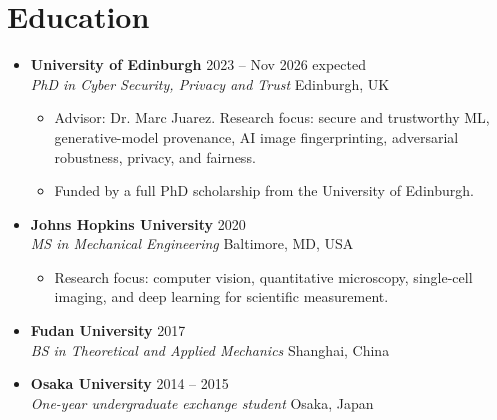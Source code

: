 \documentclass[10pt,a4paper]{article}
\newcommand{\ExpectedGraduation}{Nov 2026}
\newcommand{\entry}[4]{%
    \item \textbf{#1} \hfill #4\\
    \textit{#2} \hfill #3
}
\begin{document}
\section*{Education}
\begin{itemize}
    \entry{University of Edinburgh}{PhD in Cyber Security, Privacy and Trust}{Edinburgh, UK}{2023 -- \ExpectedGraduation{} expected}
    \begin{itemize}
        \item Advisor: Dr. Marc Juarez. Research focus: secure and trustworthy ML, generative-model provenance, AI image fingerprinting, adversarial robustness, privacy, and fairness.
        \item Funded by a full PhD scholarship from the University of Edinburgh.
    \end{itemize}
    \entry{Johns Hopkins University}{MS in Mechanical Engineering}{Baltimore, MD, USA}{2020}
    \begin{itemize}
        \item Research focus: computer vision, quantitative microscopy, single-cell imaging, and deep learning for scientific measurement.
    \end{itemize}
    \entry{Fudan University}{BS in Theoretical and Applied Mechanics}{Shanghai, China}{2017}
    \entry{Osaka University}{One-year undergraduate exchange student}{Osaka, Japan}{2014 -- 2015}
\end{itemize}
\end{document}
